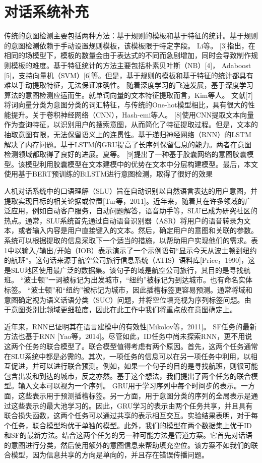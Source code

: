 \section{对话系统补充}

传统的意图检测主要包括两种方法：基于规则的模板和基于特征的统计。基于规则的意图检测依赖于手动设置规则模板，该模板限于特定字段。 Li等。 
[3]指出，在相同的场模型下，模板的数量会由于表达式的不同而急剧增加，同时会导致制作规则模板的难度。基于特征统计的方法主要包括朴素贝叶斯（NB）[4]，
Adaboost [5]，支持向量机（SVM）[6]等。但是，基于规则的模板和基于特征的统计都具有难以手动提取特征，无法保证准确性。
随着深度学习的飞速发展，基于深度学习算法的意图检测应运而生。就单词向量的文本特征提取而言，Kim等人。
文献[7]将词向量分类为意图分类的词汇特征，与传统的One-hot模型相比，具有很大的性能提升。关于卷积神经网络（CNN），Hash-emi等人。 
[8]使用CNN提取文本向量作为查询特征，以识别用户的搜索意图，从而简化了特征提取过程。但是，文本的抽取意图有限，无法保留语义上的连贯性。基于递归神经网络（RNN）的LSTM解决了内存问题。基于LSTM的GRU提高了长序列保留信息的能力。两者在意图检测领域都取得了良好的进展。夏等。 [9]提出了一种基于胶囊网络的意图胶囊模型。该模型利用胶囊模型在文本建模中的优势在文本中分层构建模型。最后，本文使用基于BERT预训练的BiLSTM进行意图检测，取得了很好的效果

人机对话系统中的口语理解（SLU）旨在自动识别以自然语言表达的用户意图，并提取实现目标的相关论据或位置[Tur等，2011]。近年来，随着其在许多领域的广泛应用，例如自动客户服务，自动问题解答，语音助手等，SLU已成为研究社区的热点。通常，SLU系统首先通过自动语音识别器（ASR）将用户的语音转录为文本，或者输入内容是用户直接键入的文本。然后，确定用户的意图和关联的参数。系统可以根据提取的信息采取下一个适当的措施，以帮助用户实现他们的需求。表1中以输入/输出/开始（IOB）表示演示了一个示例语句“显示今天从波士顿到纽约的航班”。这句话来源于航空公司旅行信息系统（ATIS）语料库[Price，1990]，这是SLU地区使用最广泛的数据集。该句子的域是航空公司旅行，其目的是寻找航班。 “波士顿”一词被标记为出发城市，“纽约”被标记为到达城市。也有命名实体标签。 “波士顿”和“纽约”被标记为城市，因此插槽标签更容易预测。通常将域和意图确定视为语义话语分类（SUC）问题，并将空位填充视为序列标签问题。由于意图类别比领域更细粒度，因此在此工作中我们将重点放在意图确定上。

近年来，RNN已证明其在语言建模中的有效性[Mikolov等，2011]。 SF任务的最新方法也基于RNN [Yao等，2014]。尽管如此，ID任务中尚未探索RNN，更不用说这两个任务的联合模型了。联合模型值得考虑有两个原因。首先，这两个任务通常在SLU系统中都是必需的。其次，一项任务的信息可以在另一项任务中利用，以相互促进，并可以进行联合预测。例如，如果一个句子的目的是寻找航班，则很可能包含出发和到达的城市，反之亦然。基于这个想法，我们提出了两个任务的联合模型。输入文本可以视为一个序列。 GRU用于学习序列中每个时间步的表示。一方面，这些表示用于预测插槽标签。另一方面，用于意图分类的序列的全局表示是通过这些表示的最大池学习的。因此，GRU学习的表示由两个任务共享，并且具有联合损失函数，这两个任务可以通过共享的表示相互交互。实验结果表明，对于每个任务，联合模型均优于单独的模型。此外，我们的模型在两个数据集上优于ID和SF的最新方法。结合这两个任务的另一种可能方法是管道方案。它首先对话语的意图进行分类，然后使用额外的意图信息来帮助填充空位。该方案不如我们的联合模型，因为信息共享的方向是单向的，并且存在错误传播问题。

